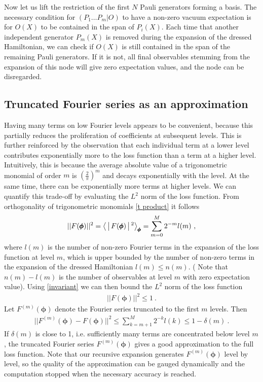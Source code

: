 \documentclass[twocolumn, amsfonts, amssymb, aps, nofootinbib]{revtex4-2}
\begin{document}
Now let us lift the restriction of the first $N$ Pauli generators forming a basis. The necessary condition for $(P_1\dots P_m|O)$ to have a non-zero vacuum expectation is for $O(X)$ to be contained in the span of $P_i(X)$. Each time that another independent generator $P_m(X)$ is removed during the expansion of the dressed Hamiltonian, we can check if $O(X)$ is still contained in the span of the remaining Pauli generators. If it is not, all final observables stemming from the expansion of this node will give zero expectation values, and the node can be disregarded.
\subsection{Truncated Fourier series as an approximation} \label{sec truncation}
Having many terms on low Fourier levels appears to be convenient, because this partially reduces the proliferation of coefficients at subsequent levels. This is further reinforced by the observation that each individual term at a lower level contributes exponentially more to the loss function than a term at a higher level. Intuitively, this is because the average absolute value of a trigonometric monomial of order $m$ is $\left(\frac{2}{\pi}\right)^{m}$ and decays exponentially with the level. At the same time, there can be exponentially more terms at higher levels. We can quantify this trade-off by evaluating the $L^2$ norm of the loss function. From orthogonality of trigonometric monomials \eqref{t product} it follows
\begin{align}
	||F(\pmb\phi)||^2=\Braket{|F(\pmb\phi)|^2}_{\pmb\phi}=\sum_{m=0}^M 2^{-m}l(m) \ ,
\end{align}
where $l(m)$ is the number of non-zero Fourier terms in the expansion of the loss function at level $m$, which is upper bounded by the number of non-zero terms in the expansion of the dressed Hamiltonian $l(m)\le n(m)$. ( Note that $n(m)-l(m)$ is the number of observables at level $m$ with zero expectation value). Using \eqref{invariant} we can then bound the $L^2$ norm of the loss function
\begin{align}
	||F(\pmb\phi)||^2\le 1 \ .
\end{align}
Let $F^{(m)}(\pmb\phi)$ denote the Fourier series truncated to the first $m$ levels. Then
\begin{align}
	||F^{(m)}(\pmb\phi)-F(\pmb\phi)||^2\le \sum_{k=m+1}^M 2^{-k}l(k)\le 1-\delta(m) \ . \label{F bound}
\end{align}
If $\delta(m)$ is close to 1, i.e. sufficiently many terms are concentrated below level $m$, the truncated Fourier series $F^{(m)}(\pmb\phi)$ gives a good approximation to the full loss function. Note that our recursive expansion generates $F^{(m)}(\pmb\phi)$ level by level, so the quality of the approximation can be gauged dynamically and the computation stopped when the necessary accuracy is reached.
\end{document}

